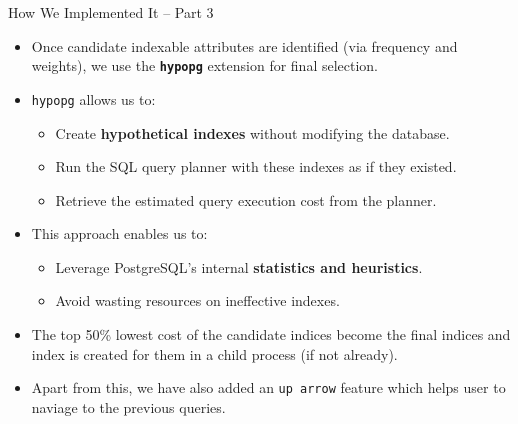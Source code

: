 \documentclass[Serif, 10pt, brown]{beamer}
\theoremstyle{example}
\theoremstyle{plain}
\begin{document}
\begin{frame}{How We Implemented It – Part 3}
	\begin{itemize}
		\item Once candidate indexable attributes are identified (via frequency and weights), we use the \textbf{\texttt{hypopg}} extension for final selection.
		
		\item \texttt{hypopg} allows us to:
		\begin{itemize}
			\item Create \textbf{hypothetical indexes} without modifying the database.
			\item Run the SQL query planner with these indexes as if they existed.
			\item Retrieve the estimated query execution cost from the planner.
		\end{itemize}
	
		\item This approach enables us to:
		\begin{itemize}
			\item Leverage PostgreSQL’s internal \textbf{statistics and heuristics}.
			\item Avoid wasting resources on ineffective indexes.
		\end{itemize}
	
		\item The top 50\% lowest cost of the candidate indices become the final indices and index is created for them in a child process (if not already).
		\item Apart from this, we have also added an \texttt{up arrow} feature which helps user to naviage to the previous queries.
	\end{itemize}
\end{frame}

	
\end{document}
